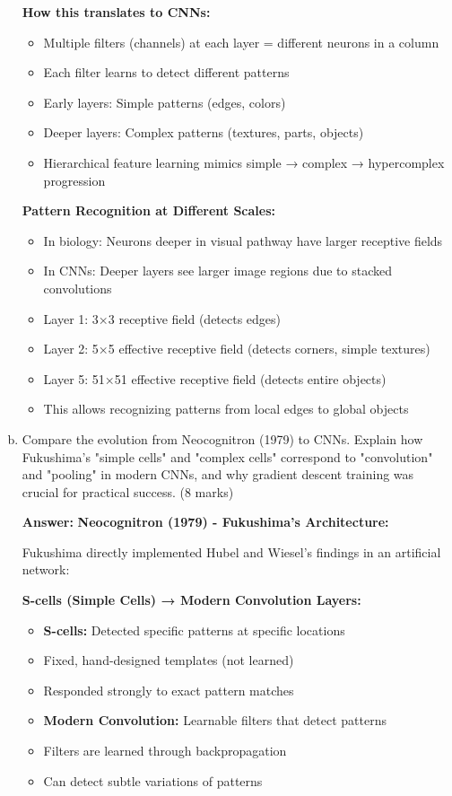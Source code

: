 \documentclass[12pt]{article}
\newcommand{\answer}[1]{{\color{answercolor}\textbf{Answer:} #1}}
\newcommand{\explanation}[1]{{\color{explanationcolor}#1}}
\begin{document}
\begin{enumerate}[(a)]
{{    \textbf{How this translates to CNNs:}
    \begin{itemize}
        \item Multiple filters (channels) at each layer = different neurons in a column
        \item Each filter learns to detect different patterns
        \item Early layers: Simple patterns (edges, colors)
        \item Deeper layers: Complex patterns (textures, parts, objects)
        \item Hierarchical feature learning mimics simple → complex → hypercomplex progression
    \end{itemize}
    }
    
    \textbf{Pattern Recognition at Different Scales:}
    
    \explanation{
    \begin{itemize}
        \item In biology: Neurons deeper in visual pathway have larger receptive fields
        \item In CNNs: Deeper layers see larger image regions due to stacked convolutions
        \item Layer 1: 3×3 receptive field (detects edges)
        \item Layer 2: 5×5 effective receptive field (detects corners, simple textures)
        \item Layer 5: 51×51 effective receptive field (detects entire objects)
        \item This allows recognizing patterns from local edges to global objects
    \end{itemize}
    }
    }
    
    \item Compare the evolution from Neocognitron (1979) to CNNs. Explain how Fukushima's "simple cells" and "complex cells" correspond to "convolution" and "pooling" in modern CNNs, and why gradient descent training was crucial for practical success. \hfill (8 marks)
    
    \answer{
    \textbf{Neocognitron (1979) - Fukushima's Architecture:}
    
    \explanation{
    Fukushima directly implemented Hubel and Wiesel's findings in an artificial network:
    }
    
    \textbf{S-cells (Simple Cells) → Modern Convolution Layers:}
    \explanation{
    \begin{itemize}
        \item \textbf{S-cells:} Detected specific patterns at specific locations
        \item Fixed, hand-designed templates (not learned)
        \item Responded strongly to exact pattern matches
        \item \textbf{Modern Convolution:} Learnable filters that detect patterns
        \item Filters are learned through backpropagation
        \item Can detect subtle variations of patterns
    \end{itemize}
    
}}
\end{enumerate}
\end{document}
